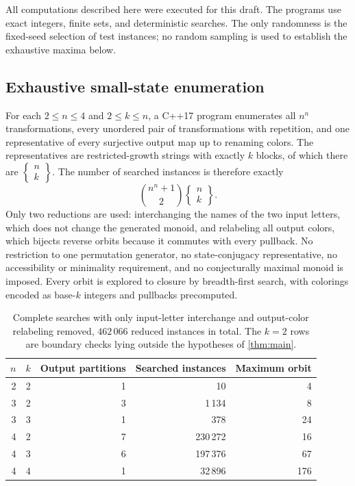 \documentclass[11pt,a4paper]{article}
\numberwithin{equation}{section}
\theoremstyle{definition}
\theoremstyle{remark}
\newcommand{\stirling}[2]{\left\{\!\begin{matrix}#1\\#2\end{matrix}\!\right\}}
\begin{document}
All computations described here were executed for this draft. The programs
use exact integers, finite sets, and deterministic searches. The only
randomness is the fixed-seed selection of test instances; no random sampling
is used to establish the exhaustive maxima below.

\subsection{Exhaustive small-state enumeration}\label{sec:exhaustive}

For each $2\le n\le4$ and $2\le k\le n$, a C++17 program enumerates all
$n^n$ transformations, every unordered pair of transformations with
repetition, and one representative of every surjective output map up to
renaming colors. The representatives are restricted-growth strings with
exactly $k$ blocks, of which there are $\stirling{n}{k}$. The number of
searched instances is therefore exactly
\begin{equation}\label{eq:cases}
 \binom{n^n+1}{2}\stirling{n}{k}.
\end{equation}
Only two reductions are used: interchanging the names of the two input
letters, which does not change the generated monoid, and relabeling all
output colors, which bijects reverse orbits because it commutes with every
pullback. No restriction to one permutation generator, no state-conjugacy
representative, no accessibility or minimality requirement, and no
conjecturally maximal monoid is imposed. Every orbit is explored to closure
by breadth-first search, with colorings encoded as base-$k$ integers and
pullbacks precomputed.

\begin{table}[htbp]
\centering
\begin{tabular}{@{}rrrrr@{}}
\toprule
$n$ & $k$ & Output partitions & Searched instances & Maximum orbit\\
\midrule
2 & 2 & 1 & 10 & 4\\
3 & 2 & 3 & 1\,134 & 8\\
3 & 3 & 1 & 378 & 24\\
4 & 2 & 7 & 230\,272 & 16\\
4 & 3 & 6 & 197\,376 & 67\\
4 & 4 & 1 & 32\,896 & 176\\
\bottomrule
\end{tabular}
\caption{Complete searches with only input-letter interchange and
output-color relabeling removed, $462\,066$ reduced instances in total.
The $k=2$ rows are boundary checks lying outside the hypotheses of
\cref{thm:main}.}
\label{tab:exhaustive}
\end{table}
\end{document}
